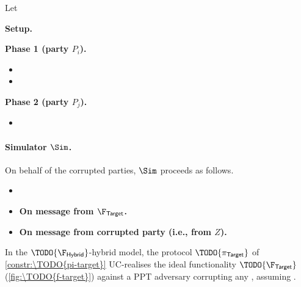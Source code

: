 \begin{construction}
\label{constr:\TODO{pi-target}}
Let 

\textbf{Setup.}

\textbf{Phase 1 (party $P_i$).}
\begin{itemize}
  \item {}
  \item {}
\end{itemize}

\textbf{Phase 2 (party $P_j$).}
\begin{itemize}
  \item {}
\end{itemize}
\end{construction}

\paragraph{Simulator $\Sim$.}
On behalf of the corrupted parties, $\Sim$ proceeds as follows.
\begin{itemize}
  \item {}
  \item \textbf{On message from $\F_\textsf{Target}$.} 
  \item \textbf{On message from corrupted party (i.e., from $Z$).} 
\end{itemize}

\begin{theorem}
\label{thm:\TODO{pi-target-uc}}
In the $\TODO{\F_\textsf{Hybrid}}$-hybrid model, the protocol
$\TODO{\pi_\textsf{Target}}$ of \cref{constr:\TODO{pi-target}} UC-realises the
ideal functionality $\TODO{\F_\textsf{Target}}$ (\cref{fig:\TODO{f-target}})
against a  PPT adversary corrupting any
, assuming .
\end{theorem}

